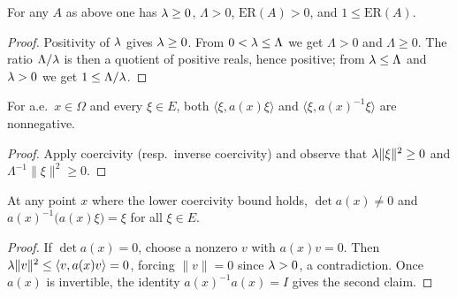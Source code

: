 \begin{lemma}
\label{lem:EllipticCoeff_lam_nonneg}
\leanok
{}
For any $A$ as above one has $\lambda \geq 0$, $\Lambda > 0$, $\mathrm{ER}(A) > 0$, and $1 \leq \mathrm{ER}(A)$.
\end{lemma}

\begin{proof}
\leanok

Positivity of $\lambda$ gives $\lambda \geq 0$. From $0 < \lambda \leq \Lambda$ we get $\Lambda > 0$ and $\Lambda \geq 0$. The ratio $\Lambda/\lambda$ is then a quotient of positive reals, hence positive; from $\lambda \leq \Lambda$ and $\lambda > 0$ we get $1 \leq \Lambda/\lambda$.
\end{proof}

\begin{lemma}
\label{lem:EllipticCoeff_ae_coercive_nonneg}
\leanok
For a.e.\ $x \in \Omega$ and every $\xi \in E$, both $\langle \xi, a(x)\xi\rangle$ and $\langle \xi, a(x)^{-1}\xi\rangle$ are nonnegative.
\end{lemma}

\begin{proof}
\leanok
{}

Apply coercivity (resp.\ inverse coercivity) and observe that $\lambda\|\xi\|^2 \geq 0$ and $\Lambda^{-1}\|\xi\|^2 \geq 0$.
\end{proof}

\begin{lemma}
\label{lem:EllipticCoeff_det_ne_zero_of_coercive}
\leanok
At any point $x$ where the lower coercivity bound holds, $\det a(x) \neq 0$ and $a(x)^{-1}\bigl(a(x)\xi\bigr) = \xi$ for all $\xi \in E$.
\end{lemma}

\begin{proof}
\leanok
{}

If $\det a(x) = 0$, choose a nonzero $v$ with $a(x) v = 0$. Then $\lambda\|v\|^2 \leq \langle v, a(x)v\rangle = 0$, forcing $\|v\| = 0$ since $\lambda > 0$, a contradiction. Once $a(x)$ is invertible, the identity $a(x)^{-1}a(x) = I$ gives the second claim.
\end{proof}


